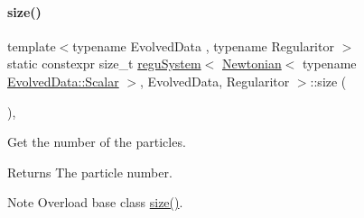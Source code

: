 \paragraph{\texorpdfstring{size()}{size()}}
{\footnotesize\ttfamily template$<$typename Evolved\+Data , typename Regularitor $>$ \\
static constexpr size\+\_\+t \mbox{\hyperlink{classregu_system}{regu\+System}}$<$ \mbox{\hyperlink{class_newtonian}{Newtonian}}$<$ typename \mbox{\hyperlink{classregu_system_aca8ee2c387943164ee3ea68370fc3ac0}{Evolved\+Data\+::\+Scalar}} $>$, Evolved\+Data, Regularitor $>$\+::size (\begin{DoxyParamCaption}{ }\end{DoxyParamCaption})\hspace{0.3cm}{\ttfamily [inline]}, {\ttfamily [static]}}



Get the number of the particles. 

\begin{DoxyReturn}{Returns}
The particle number. 
\end{DoxyReturn}
\begin{DoxyNote}{Note}
Overload base class \mbox{\hyperlink{classregu_system_3_01_newtonian_3_01typename_01_evolved_data_1_1_scalar_01_4_00_01_evolved_data_00_01_regularitor_01_4_a168315b01bf058c43a97b0d364a5f649}{size()}}. 
\end{DoxyNote}
\mbox{\label{classregu_system_3_01_newtonian_3_01typename_01_evolved_data_1_1_scalar_01_4_00_01_evolved_data_00_01_regularitor_01_4_adc3c44589517529c80470050edf5db0c}} 
